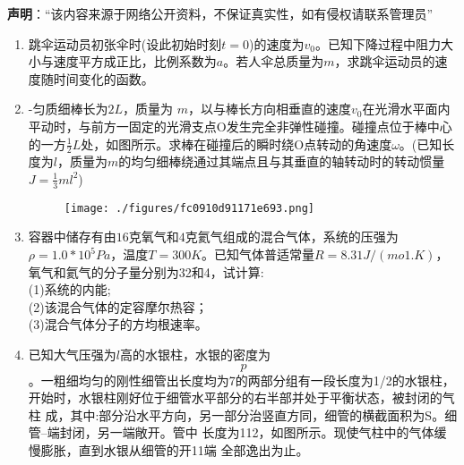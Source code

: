 
\textbf{声明}：“该内容来源于网络公开资料，不保证真实性，如有侵权请联系管理员”

\begin{enumerate}
\item 跳伞运动员初张伞时(设此初始时刻$t=0$)的速度为$v_0$。已知下降过程中阻力大小与速度平方成正比，比例系数为$a$。若人伞总质量为$m$，求跳伞运动员的速度随时间变化的函数。
\item -匀质细棒长为$ 2L$，质量为 $m$，以与棒长方向相垂直的速度$v_0$在光滑水平面内平动时，与前方一固定的光滑支点O发生完全非弹性碰撞。碰撞点位于棒中心的一方$\frac{1}{2}L$处，如图所示。求棒在碰撞后的瞬时绕O点转动的角速度$\omega$。(已知长度为$l$，质量为$m$的均匀细棒绕通过其端点且与其垂直的轴转动时的转动惯量$J=\frac{1}{3}ml^2$)
\begin{figure}[ht]
\centering
\texttt{[image: ./figures/fc0910d91171e693.png]}
\caption{} \label{fig_XD11_1}
\end{figure}
\item 容器中储存有由$16$克氧气和$4$克氦气组成的混合气体，系统的压强为$\rho=1.0*10^5Pa$，温度$T=300K$。已知气体普适常量$R=8.31J/(mo1.K)$，氧气和氦气的分子量分别为32和4，试计算:\\
(1)系统的内能;\\
(2)该混合气体的定容摩尔热容；\\
(3)混合气体分子的方均根速率。
\item 已知大气压强为$l$高的水银柱，水银的密度为$$p$$。一粗细均匀的刚性细管出长度均为7的两部分组有一段长度为1/2的水银柱，开始时，水银柱刚好位于细管水平部分的右半部并处于平衡状态，被封闭的气柱
成，其中:部分沿水平方向，另一部分治竖直方同，细管的横截面积为S。细管--端封闭，另一端敞开。管中
长度为112，如图所示。现使气柱中的气体缓慢膨胀，直到水银从细管的开11端
全部逸出为止。
\end{enumerate}